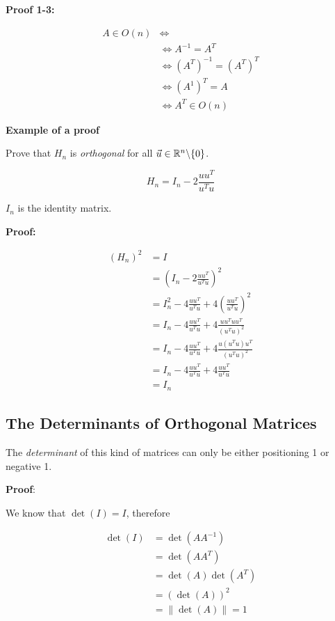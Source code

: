 \textbf{Proof 1-3:}

\begin{align*}
    A \in O(n) &\iff \\
               &\iff A^{-1} = A^T\\
               &\iff (A^T)^{-1} = (A^T)^T \\
               &\iff (A^{1})^{T} = A\\
               &\iff A^T \in O(n)
\end{align*}

\textbf{Example of a proof}
\vspace{\baselineskip}

Prove that \(H_n\) is \emph{orthogonal} for all \(\vec{u}\in \mathbb{R}^n \backslash \{0\} \).

\[
    H_n = I_n - 2 \frac{uu^T}{u^Tu}
\]

\(I_n\) is the identity matrix.
\vspace{\baselineskip}

\textbf{Proof:}

\begin{align*}
    (H_n)^2 &= I \\
    &= \left(I_n - 2 \frac{uu^T}{u^Tu}\right)^2\\
    &= I_n^2 - 4\frac{uu^T}{u^Tu} + 4\left(\frac{uu^T}{u^Tu}\right)^2\\
    &= I_n -4\frac{uu^T}{u^Tu} +4\frac{uu^T uu^T}{(u^Tu)^2}\\ 
    &= I_n -4\frac{uu^T}{u^Tu} +4\frac{u(u^T u)u^T}{(u^Tu)^2}\\ 
    &= I_n -4\frac{uu^T}{u^Tu} +4\frac{uu^T}{u^Tu}\\ 
    &= I_n
\end{align*}

\QED

\subsection{The Determinants of Orthogonal Matrices}

The \emph{determinant} of this kind of matrices can only be either positioning 1 or negative 1.
\vspace{\baselineskip}

\textbf{Proof}:

We know that \(\det(I) = I \), therefore

\begin{align*}
    \det(I) &= \det(A A^{-1}) \\
            &= \det(A A^T) \\
            &= \det(A) \det(A^T) \\
            &= (\det(A))^2 \\
            &= \|\det (A) \| = 1
\end{align*}

